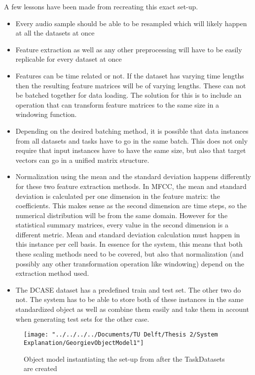A few lessons have been made from recreating this exact set-up. 

\begin{itemize}
	\item Every audio sample should be able to be resampled which will likely happen at all the datasets at once
	\item Feature extraction as well as any other preprocessing will have to be easily replicable for every dataset at once
	\item Features can be time related or not. If the dataset has varying time lengths then the resulting feature matrices will be of varying lengths. These can not be batched together for data loading. The solution for this is to include an operation that can transform feature matrices to the same size in a windowing function. 
	\item Depending on the desired batching method, it is possible that data instances from all datasets and tasks have to go in the same batch. This does not only require that input instances have to have the same size, but also that target vectors can go in a unified matrix structure.
	\item Normalization using the mean and the standard deviation happens differently for these two feature extraction methods. In MFCC, the mean and standard deviation is calculated per one dimension in the feature matrix: the coefficients. This makes sense as the second dimension are time steps, so the numerical distribution will be from the same domain. However for the statistical summary matrices, every value in the second dimension is a different metric. Mean and standard deviation calculation must happen in this instance per cell basis. In essence for the system, this means that both these scaling methods need to be covered, but also that normalization (and possibly any other transformation operation like windowing) depend on the extraction method used.
	\item The DCASE dataset has a predefined train and test set. The other two do not. The system has to be able to store both of these instances in the same standardized object as well as combine them easily and take them in account when generating test sets for the other case.
\end{itemize}



\begin{figure}
	\centering
	\texttt{[image: "../../../../Documents/TU Delft/Thesis 2/System Explanation/GeorgievObjectModel1"]}
	\caption{Object model instantiating the set-up from \cite{georgiev2017low} after the TaskDatasets are created}
	\label{fig:georgievobjectmodel1}
\end{figure}

